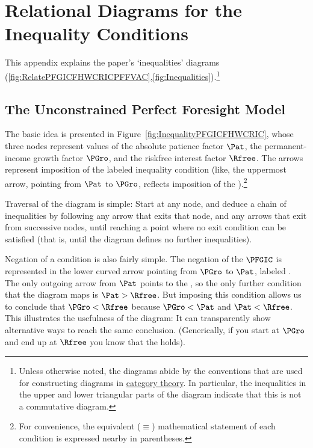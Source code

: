 \documentclass[\econtexRoot/BufferStockTheory]{subfiles}
\begin{document}
\label{sec:ApndxConditionDiagrams}
\hypertarget{ApndxConditionDiagrams}{}
\section{Relational Diagrams for the Inequality Conditions}

This appendix explains the paper's `inequalities' diagrams (\ref{fig:RelatePFGICFHWCRICPFFVAC},\ref{fig:Inequalities}).\footnote{Unless otherwise noted, the diagrams abide by the conventions that are used for constructing diagrams in \href{https://en.wikipedia.org/wiki/Diagram_(category_theory)}{category theory}.  In particular, the inequalities in the upper and lower triangular parts of the diagram indicate that this is not a commutative diagram.}


\subsection{The Unconstrained Perfect Foresight Model}


The basic idea is presented in Figure~\ref{fig:InequalityPFGICFHWCRIC}, whose three nodes represent values of the absolute patience factor $\Pat$, the permanent-income growth factor $\PGro$, and the riskfree interest factor $\Rfree$.  The arrows represent imposition of the labeled inequality condition  (like,  the uppermost arrow, pointing from {$\Pat$} to $\PGro$, reflects imposition of the {\PFGIC}).\footnote{For convenience, the equivalent ($\equiv$) mathematical statement of each condition is expressed nearby in parentheses.}

Traversal of the diagram is simple: Start at any node, and deduce a chain of inequalities by following any arrow that exits that node, and any arrows that exit from successive nodes, until reaching a point where no exit condition can be satisfied (that is, until the diagram defines no further inequalities).

Negation of a condition is also fairly simple.  The negation of the $\PFGIC$ is represented in the lower curved arrow pointing from $\PGro$ to {$\Pat$}, labeled \cncl{\PFGIC}.  The only outgoing arrow from $\Pat$ points to the {\RIC}, so the only further condition that the diagram maps is $\Pat > \Rfree$.  But imposing this condition allows us to conclude that $\PGro < \Rfree$ because $\PGro < \Pat$ and $\Pat < \Rfree$.  This illustrates the usefulness of the diagram: It can transparently show alternative ways to reach the same conclusion.  (Generically, if you start at $\PGro$ and end up at $\Rfree$ you know that the {\FHWC} holds).
\end{document}
